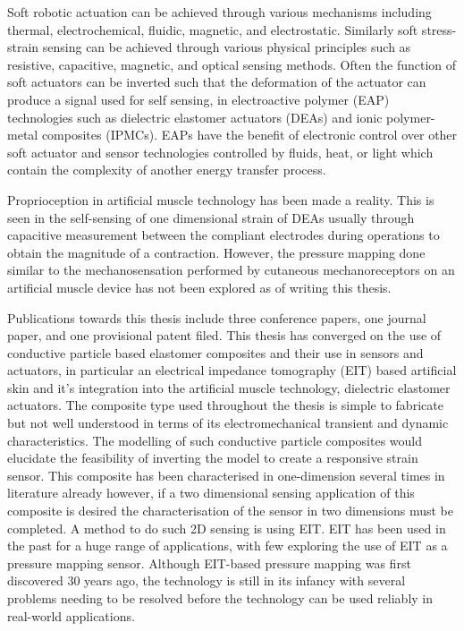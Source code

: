 
Soft robotic actuation can be achieved through various mechanisms including thermal, electrochemical, fluidic, magnetic, and electrostatic. Similarly soft stress-strain sensing can be achieved through various physical principles such as resistive, capacitive, magnetic, and optical sensing methods. Often the function of soft actuators can be inverted such that the deformation of the actuator can produce a signal used for self sensing, in electroactive polymer (EAP) technologies such as dielectric elastomer actuators (DEAs)\cite{Gisby2013, Rosset2013, Liu2016, Huang2023} and ionic polymer-metal composites (IPMCs)\cite{MohdIsa2019}. EAPs have the benefit of electronic control over other soft actuator and sensor technologies controlled by fluids, heat, or light which contain the complexity of another energy transfer process.

Proprioception in artificial muscle technology has been made a reality. This is seen in the self-sensing of one dimensional strain of DEAs usually through capacitive measurement between the compliant electrodes during operations to obtain the magnitude of a contraction. However, the pressure mapping done similar to the mechanosensation performed by cutaneous mechanoreceptors on an artificial muscle device has not been explored as of writing this thesis. 

Publications towards this thesis include three conference papers, one journal paper, and one provisional patent filed. This thesis has converged on the use of conductive particle based elastomer composites and their use in sensors and actuators, in particular an electrical impedance tomography (EIT) based artificial skin and it's integration into the artificial muscle technology, dielectric elastomer actuators. The composite type used throughout the thesis is simple to fabricate but not well understood in terms of its electromechanical transient and dynamic characteristics. The modelling of such conductive particle composites would elucidate the feasibility of inverting the model to create a responsive strain sensor. This composite has been characterised in one-dimension several times in literature already however, if a two dimensional sensing application of this composite is desired the characterisation of the sensor in two dimensions must be completed. A method to do such 2D sensing is using EIT. EIT has been used in the past for a huge range of applications, with few exploring the use of EIT as a pressure mapping sensor. Although EIT-based pressure mapping was first discovered 30 years ago, the technology is still in its infancy with several problems needing to be resolved before the technology can be used reliably in real-world applications.


